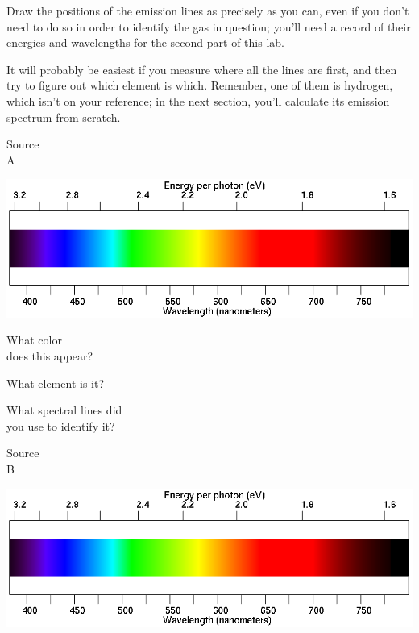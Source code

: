 \documentclass[11pt]{article}
\begin{document}
Draw the positions of the emission lines as precisely as you can, even if you don't need to do so in order
to identify the gas in question; you'll need a record of their energies and wavelengths for the second part of this lab.

It will probably be easiest if you measure where all the lines are first, and then try to figure out which
element is which. Remember, one of them is hydrogen, which isn't on your reference; in the next section, you'll calculate its emission spectrum from scratch.


\begin{minipage}{0.1\textwidth}
	\begin{center}
		\Large Source \\ A
	\end{center}
\end{minipage}
\begin{minipage}{0.7\textwidth}
	\includegraphics[width=\textwidth]{spectrum2.png}
\end{minipage}

\begin{minipage}{0.33\textwidth}
	What color \\does this appear?
\end{minipage}
\begin{minipage}{0.33\textwidth}
	What element is it?
\end{minipage}
\begin{minipage}{0.33\textwidth}
	What spectral lines did\\
	you use to identify it?
\end{minipage}

\vspace{1in}

\begin{minipage}{0.1\textwidth}
	\begin{center}
		\Large Source \\ B
	\end{center}
\end{minipage}
\begin{minipage}{0.7\textwidth}
	\includegraphics[width=\textwidth]{spectrum2.png}
\end{minipage}
\end{document}
